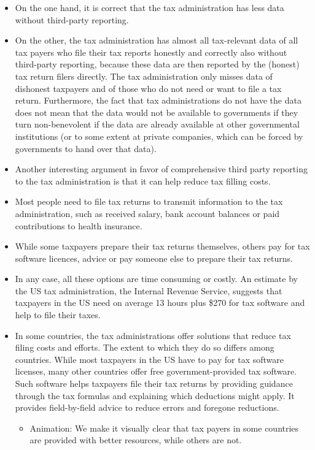 \documentclass[11pt]{article}
\begin{document}
\begin{itemize}
    \item On the one hand, it is correct that the tax administration has less data without third-party reporting.
    \item On the other, the tax administration has almost all tax-relevant data of all tax payers who file their tax reports honestly and correctly also without third-party reporting, because these data are then reported by the (honest) tax return filers directly. The tax administration only misses data of dishonest taxpayers and of those who do not need or want to file a tax return. Furthermore, the fact that tax administrations do not have the data does not mean that the data would not be available to governments if they turn non-benevolent if the data are already available at other governmental institutions (or to some extent at private companies, which can be forced by governments to hand over that data).
    \item Another interesting argument in favor of comprehensive third party reporting to the tax administration is that it can help reduce tax filling costs. 
    \item Most people need to file tax returns to transmit information to the tax administration, such as received salary, bank account balances or paid contributions to health insurance.
    \item While some taxpayers prepare their tax returns themselves, others pay for tax software licences, advice or pay someone else to prepare their tax returns. 
    \item In any case, all these options are time consuming or costly. An estimate by the US tax administration, the Internal Revenue Service, suggests that taxpayers in the US need on average  13 hours plus \$270 for tax software and help to file their taxes.
    \item In some countries, the tax administrations offer solutions that reduce tax filing costs and efforts. The extent to which they do so differs among countries. While most taxpayers in the US have to pay for tax software licenses, many other countries offer free government-provided tax software. Such software helps taxpayers file their tax returns by providing guidance through the tax formulas and explaining which deductions might apply. It provides field-by-field advice to reduce errors and foregone reductions.
    \begin{itemize}
        \item Animation: We make it visually clear that tax payers in some countries are provided with better resources, while others are not. 

\end{itemize}
\end{itemize}
\end{document}
